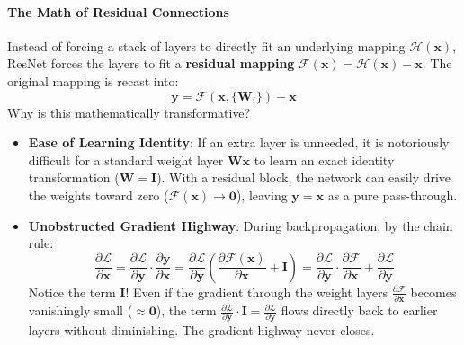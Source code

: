 \paragraph{The Math of Residual Connections}
Instead of forcing a stack of layers to directly fit an underlying mapping $\mathcal{H}(\mathbf{x})$, ResNet forces the layers to fit a \textbf{residual mapping} $\mathcal{F}(\mathbf{x}) = \mathcal{H}(\mathbf{x}) - \mathbf{x}$. The original mapping is recast into:
\begin{equation}
\mathbf{y} = \mathcal{F}(\mathbf{x}, \{\mathbf{W}_i\}) + \mathbf{x}\label{eq:residual_eq}
\end{equation}
Why is this mathematically transformative?
\begin{itemize}
    \item \textbf{Ease of Learning Identity}: If an extra layer is unneeded, it is notoriously difficult for a standard weight layer $\mathbf{W}\mathbf{x}$ to learn an exact identity transformation ($\mathbf{W} = \mathbf{I}$). With a residual block, the network can easily drive the weights toward zero ($\mathcal{F}(\mathbf{x}) \to \mathbf{0}$), leaving $\mathbf{y} = \mathbf{x}$ as a pure pass-through.
    \item \textbf{Unobstructed Gradient Highway}: During backpropagation, by the chain rule:
    \begin{equation}
    \frac{\partial \mathcal{L}}{\partial \mathbf{x}} = \frac{\partial \mathcal{L}}{\partial \mathbf{y}} \cdot \frac{\partial \mathbf{y}}{\partial \mathbf{x}} = \frac{\partial \mathcal{L}}{\partial \mathbf{y}} \left( \frac{\partial \mathcal{F}(\mathbf{x})}{\partial \mathbf{x}} + \mathbf{I} \right) = \frac{\partial \mathcal{L}}{\partial \mathbf{y}} \cdot \frac{\partial \mathcal{F}}{\partial \mathbf{x}} + \frac{\partial \mathcal{L}}{\partial \mathbf{y}}\label{eq:resnet_gradient}
    \end{equation}
    Notice the term $\mathbf{I}$! Even if the gradient through the weight layers $\frac{\partial \mathcal{F}}{\partial \mathbf{x}}$ becomes vanishingly small ($\approx \mathbf{0}$), the term $\frac{\partial \mathcal{L}}{\partial \mathbf{y}} \cdot \mathbf{I} = \frac{\partial \mathcal{L}}{\partial \mathbf{y}}$ flows directly back to earlier layers without diminishing. The gradient highway never closes.
\end{itemize}

